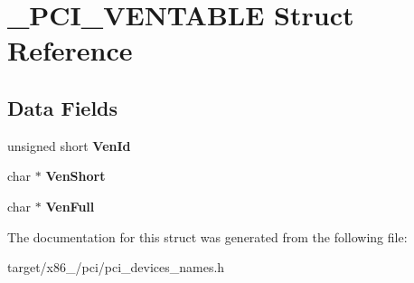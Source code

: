\hypertarget{struct__PCI__VENTABLE}{}\section{\+\_\+\+P\+C\+I\+\_\+\+V\+E\+N\+T\+A\+B\+LE Struct Reference}
\label{struct__PCI__VENTABLE}
\subsection*{Data Fields}
\begin{DoxyCompactItemize}
\item 
unsigned short {\bfseries Ven\+Id}\hypertarget{struct__PCI__VENTABLE_a8df580b1447df15ebe8a128b8225e710}{}\label{struct__PCI__VENTABLE_a8df580b1447df15ebe8a128b8225e710}

\item 
char $\ast$ {\bfseries Ven\+Short}\hypertarget{struct__PCI__VENTABLE_a70a9594416a16e3bbc3e184125e34173}{}\label{struct__PCI__VENTABLE_a70a9594416a16e3bbc3e184125e34173}

\item 
char $\ast$ {\bfseries Ven\+Full}\hypertarget{struct__PCI__VENTABLE_ad19ebb9f052eb9a58a5015185a9bdd11}{}\label{struct__PCI__VENTABLE_ad19ebb9f052eb9a58a5015185a9bdd11}

\end{DoxyCompactItemize}


The documentation for this struct was generated from the following file\+:\begin{DoxyCompactItemize}
\item 
target/x86\+\_/pci/pci\+\_\+devices\+\_\+names.\+h\end{DoxyCompactItemize}
